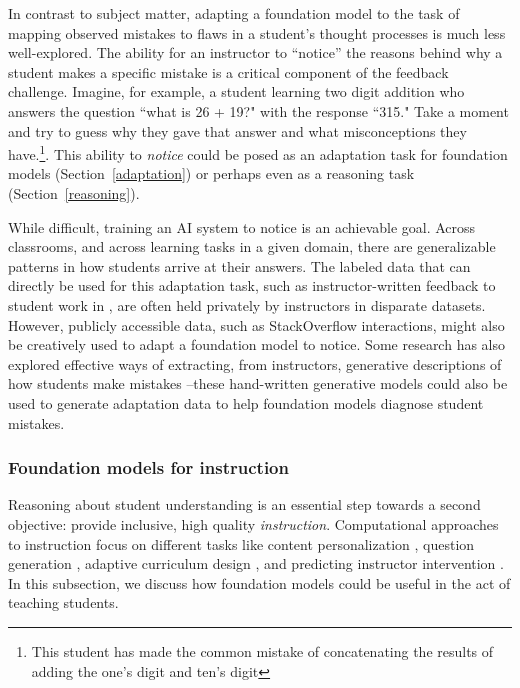 In contrast to subject matter, adapting a foundation model to the task of mapping observed mistakes to flaws in a student's thought processes is much less well-explored. The ability for an instructor to ``notice'' the reasons behind why a student makes a specific mistake is a critical component of the feedback challenge. Imagine, for example, a student learning two digit addition who answers the question ``what is 26 + 19?" with the response ``315." Take a moment and try to guess why they gave that answer and what misconceptions they have.\footnote{This student has made the common mistake of concatenating the results of adding the one's digit and ten's digit}. This ability to \emph{notice} could be posed as an adaptation task for foundation models (Section~\ref{adaptation}) or perhaps even as a reasoning task (Section~\ref{reasoning}).  

While difficult, training an AI system to notice is an achievable goal. Across classrooms, and across learning tasks in a given domain, there are generalizable patterns in how students arrive at their answers. The labeled data that can directly be used for this adaptation task, such as instructor-written feedback to student work in \citep{wu2021prototransf}, are often held privately by instructors in disparate datasets. However,  publicly accessible data, such as StackOverflow interactions, might also be creatively used to adapt a foundation model to notice. Some research has also explored  effective ways of extracting, from instructors, generative descriptions of how students make mistakes \cite{malik2021generative, gulwani2013automated}--these hand-written generative models could also be used to generate adaptation data to help foundation models diagnose student mistakes.

\subsubsection{Foundation models for instruction}

Reasoning about student understanding is an essential step towards a second objective: provide inclusive, high quality \emph{instruction}. 
Computational approaches to instruction focus on different tasks like content personalization \citep{connor2019using}, question generation \cite{Guo2016questimator, willis2019keyphrase, srivastava2021question}, adaptive curriculum design \cite{mandel2014rleducgames, doroudi2017robusevalmatrix}, and predicting instructor intervention \cite{chandrasekaran2019reply, alrajhi2021urgency}. In this subsection, we discuss how foundation models could be useful in the act of teaching students. 

